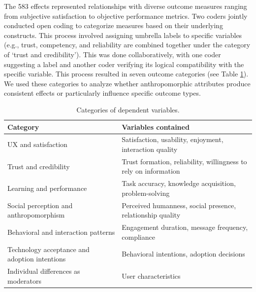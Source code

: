 \documentclass[manuscript,anonymous,sigconf]{acmart}
\begin{document}
The 583 effects represented relationships with diverse outcome measures ranging from subjective satisfaction to objective performance metrics. Two coders jointly conducted open coding to categorize measures based on their underlying constructs. This process involved assigning umbrella labels to specific variables (e.g., trust, competency, and reliability are combined together under the category of `trust and credibility'). This was done collaboratively, with one coder suggesting a label and another coder verifying its logical compatibility with the specific variable. %
This process resulted in seven outcome categories (see Table \ref{tab:categories}). We used these categories to analyze whether anthropomorphic attributes produce consistent effects or particularly influence specific outcome types. %

\begin{table}[h]
\caption{Categories of dependent variables.}
\label{tab:categories}
\small
\begin{tabular}{@{}p{}p{}@{}}
\toprule
\textbf{Category} & \textbf{Variables contained} \\
\midrule
UX and satisfaction & Satisfaction, usability, enjoyment, interaction quality \\
\addlinespace
Trust and credibility & Trust formation, reliability, willingness to rely on information \\
\addlinespace
Learning and performance & Task accuracy, knowledge acquisition, problem-solving \\
\addlinespace
Social perception and anthropomorphism & Perceived humanness, social presence, relationship quality \\
\addlinespace
Behavioral and interaction patterns & Engagement duration, message frequency, compliance \\
\addlinespace
Technology acceptance and adoption intentions & Behavioral intentions, adoption decisions \\
\addlinespace
Individual differences as moderators & User characteristics \\
\bottomrule
\end{tabular}
\end{table}
\end{document}
